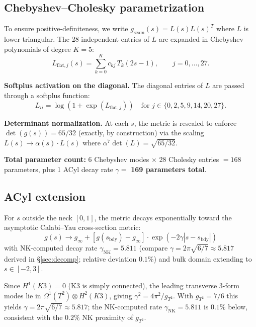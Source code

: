 \documentclass[11pt,a4paper]{article}
\theoremstyle{definition}
\theoremstyle{remark}
\begin{document}
\subsection{Chebyshev--Cholesky parametrization}\label{sec:cheb}

To ensure positive-definiteness, we write $g_{\mathrm{seam}}(s) = L(s)L(s)^T$ where $L$ is lower-triangular. The 28 independent entries of $L$ are expanded in Chebyshev polynomials of degree $K = 5$:
\begin{equation}
L_{\mathrm{flat},j}(s) = \sum_{k=0}^{K} c_{kj}\, T_k(2s - 1), \qquad j = 0, \ldots, 27.
\end{equation}

\textbf{Softplus activation on the diagonal.} The diagonal entries of $L$ are passed through a softplus function:
\begin{equation}
L_{ii} = \log(1 + \exp(L_{\mathrm{flat},j})) \quad \text{for } j \in \{0, 2, 5, 9, 14, 20, 27\}.
\end{equation}

\textbf{Determinant normalization.} At each $s$, the metric is rescaled to enforce $\det(g(s)) = 65/32$ (exactly, by construction) via the scaling $L(s) \to \alpha(s) \cdot L(s)$ where $\alpha^7 \det(L) = \sqrt{65/32}$.

\textbf{Total parameter count:} $6$ Chebyshev modes $\times$ 28 Cholesky entries $= 168$ parameters, plus 1 ACyl decay rate $\gamma = $ \textbf{169 parameters total}.

\subsection{ACyl extension}\label{sec:acyl}

For $s$ outside the neck $[0, 1]$, the metric decays exponentially toward the asymptotic Calabi--Yau cross-section metric:
\begin{equation}
g(s) \to g_\infty + [g(s_{\mathrm{bdy}}) - g_\infty] \cdot \exp(-2\gamma|s - s_{\mathrm{bdy}}|)
\end{equation}
with NK-computed decay rate $\gamma_{\mathrm{NK}} = 5.811$ (compare $\gamma = 2\pi\sqrt{6/7} \approx 5.817$ derived in §\ref{sec:decomp}; relative deviation $0.1\%$) and bulk domain extending to $s \in [-2, 3]$.

Since $H^1(K3) = 0$ (K3 is simply connected), the leading transverse 3-form modes lie in $\Omega^1(T^2) \otimes H^2(K3)$, giving $\gamma^2 = 4\pi^2/g_{T^2}$. With $g_{T^2} = 7/6$ this yields $\gamma = 2\pi\sqrt{6/7} \approx 5.817$; the NK-computed rate $\gamma_{\mathrm{NK}} = 5.811$ is $0.1\%$ below, consistent with the $0.2\%$ NK proximity of $g_{T^2}$.
\end{document}
